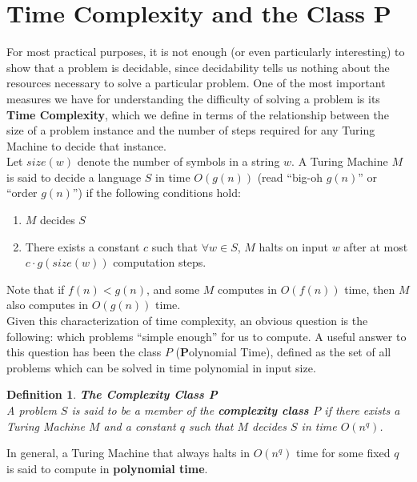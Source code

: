 \documentclass{article}
\newtheorem{definition}{Definition}[section]
\begin{document}
\section{Time Complexity and the Class P}

For most practical purposes, it is not enough (or even particularly
interesting) to show that a problem is decidable, since decidability
tells us nothing about the resources necessary to solve a particular
problem.  One of the most important measures we have for
understanding the difficulty of solving a problem is its
\textbf{Time Complexity}, which we define in terms of the
relationship between the size of a problem instance and the number
of steps required for any Turing Machine to decide that instance.
\\

Let $size(w)$ denote the number of symbols in a string $w$.  A Turing
Machine $M$ is said to decide a language $S$ in time $O(g(n))$ (read
``big-oh $g(n)$'' or ``order $g(n)$'') if the following conditions
hold:

\begin{enumerate}
\item $M$ decides $S$
\item There exists a constant $c$ such that $\forall w \in S$, $M$ halts on
  input $w$ after at most $c \cdot g(size(w))$ computation steps.
\end{enumerate}

Note that if $f(n) < g(n)$, and some $M$
computes in $O(f(n))$ time, then $M$ also computes in $O(g(n))$
time.\\

Given this characterization of time complexity, an obvious question is
the following: which problems ``simple enough'' for us to compute. A
useful answer to this question has been the class $P$
(\textbf{P}olynomial Time), defined as the set of all problems which
can be solved in time
polynomial in input size. \\

\begin{definition}{\textbf{The Complexity Class P}}\\

  A problem $S$ is said to be a member of the \textbf{complexity
    class $P$} if there exists a Turing Machine $M$ and a constant
  $q$ such that $M$ decides $S$ in time $O(n^q)$.
\end{definition}

In general, a Turing Machine that always halts in $O(n^q)$ time for
some fixed $q$ is said to compute in \textbf{polynomial time}.
\end{document}
